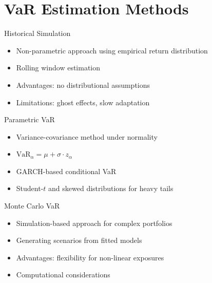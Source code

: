 \documentclass[9pt, aspectratio=169, t]{beamer}
\theoremstyle{definition}
\begin{document}
\section{VaR Estimation Methods}

\begin{frame}{Historical Simulation}
    \begin{itemize}
        \item Non-parametric approach using empirical return distribution
        \item Rolling window estimation
        \item Advantages: no distributional assumptions
        \item Limitations: ghost effects, slow adaptation
    \end{itemize}
\end{frame}

\begin{frame}{Parametric VaR}
    \begin{itemize}
        \item Variance-covariance method under normality
        \item $\text{VaR}_\alpha = \mu + \sigma \cdot z_\alpha$
        \item GARCH-based conditional VaR
        \item Student-$t$ and skewed distributions for heavy tails
    \end{itemize}
\end{frame}

\begin{frame}{Monte Carlo VaR}
    \begin{itemize}
        \item Simulation-based approach for complex portfolios
        \item Generating scenarios from fitted models
        \item Advantages: flexibility for non-linear exposures
        \item Computational considerations
    \end{itemize}
\end{frame}

\end{document}
